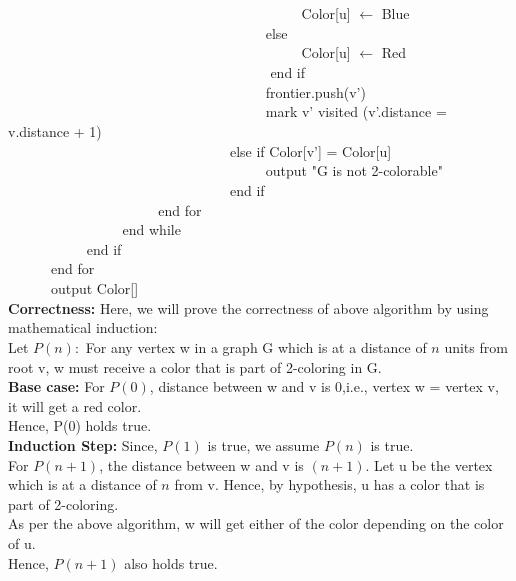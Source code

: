 \documentclass[12pt]{article}
\begin{document}
\begin{enumerate}
\begin{enumerate}
\verb|		|\verb|		|\verb|		|\verb|		|\verb|		|\verb|		|\verb|		|\verb|		|Color[u] $\leftarrow$ Blue \\
\verb|		|\verb|		|\verb|		|\verb|		|\verb|		|\verb|		|\verb|		|else\\
\verb|		|\verb|		|\verb|		|\verb|		|\verb|		|\verb|		|\verb|		|\verb|		|Color[u] $\leftarrow$ Red\\
\verb|		|\verb|		|\verb|		|\verb|		|\verb|		|\verb|		|\verb|		| end if\\
\verb|		|\verb|		|\verb|		|\verb|		|\verb|		|\verb|		|\verb|		|frontier.push(v')\\
\verb|		|\verb|		|\verb|		|\verb|		|\verb|		|\verb|		|\verb|		|mark v' visited (v'.distance = v.distance + 1)\\
\verb|		|\verb|		|\verb|		|\verb|		|\verb|		|\verb|		|else if Color[v'] = Color[u] \\
\verb|		|\verb|		|\verb|		|\verb|		|\verb|		|\verb|		|\verb|		|output "G is not 2-colorable"\\
\verb|		|\verb|		|\verb|		|\verb|		|\verb|		|\verb|		|end if \\
\verb|		|\verb|		|\verb|		|\verb|		|end for\\
\verb|		|\verb|		|\verb|		|end while \\
\verb|		|\verb|		|end if\\
\verb|		|end for \\
\verb|		|output Color[]\\
\textbf{Correctness:} Here, we will prove the correctness of above algorithm by using mathematical induction:\\
Let $P(n) :$ For any vertex w in a graph G which is at a distance of $n$ units from root v, w must receive a color that is part of 2-coloring in G. \\
\textbf{Base case:} For $P(0)$, distance between w and v is 0,i.e., vertex w = vertex v, it will get a red color. \\
Hence, P(0) holds true.\\
\textbf{Induction Step:} Since, $P(1)$ is true, we assume $P(n)$ is true.\\
For $P(n+1)$, the distance between w and v is $(n+1)$. Let u be the vertex which is at a distance of $n$ from v. Hence, by hypothesis, u has a color that is part of 2-coloring. \\
As per the above algorithm, w will get either of the color depending on the color of u.\\
Hence, $P(n+1)$ also holds true.\\

\end{enumerate}
\end{enumerate}
\end{document}
